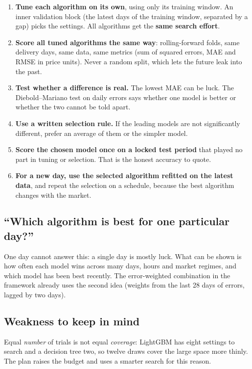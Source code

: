 \documentclass[11pt,a4paper]{article}
\begin{document}
\begin{enumerate}
\item \textbf{Tune each algorithm on its own}, using only its training window. An inner validation block (the latest days
      of the training window, separated by a gap) picks the settings. All algorithms get the \textbf{same search effort}.
\item \textbf{Score all tuned algorithms the same way}: rolling-forward folds, same delivery days, same data, same metrics
      (sum of squared errors, MAE and RMSE in price units). Never a random split, which lets the future leak into the past.
\item \textbf{Test whether a difference is real.} The lowest MAE can be luck. The Diebold--Mariano test on daily errors
      says whether one model is better or whether the two cannot be told apart.
\item \textbf{Use a written selection rule.} If the leading models are not significantly different, prefer an average of
      them or the simpler model.
\item \textbf{Score the chosen model once on a locked test period} that played no part in tuning or selection. That is
      the honest accuracy to quote.
\item \textbf{For a new day, use the selected algorithm refitted on the latest data}, and repeat the selection on a
      schedule, because the best algorithm changes with the market.
\end{enumerate}

\subsection{``Which algorithm is best for one particular day?''}

One day cannot answer this: a single day is mostly luck. What can be shown is how often each model wins across many
days, hours and market regimes, and which model has been best recently. The error-weighted combination in the framework
already uses the second idea (weights from the last 28 days of errors, lagged by two days).

\subsection{Weakness to keep in mind}

Equal \emph{number} of trials is not equal \emph{coverage}: LightGBM has eight settings to search and a decision tree
two, so twelve draws cover the large space more thinly. The plan raises the budget and uses a smarter search for this
reason.
\end{document}
